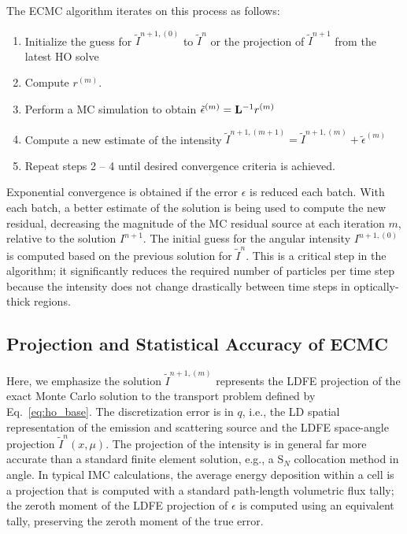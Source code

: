 The ECMC algorithm iterates on this process as follows:
\begin{enumerate}
    \item Initialize the guess for $\tilde{I}^{n+1,(0)}$ to $\tilde{I}^{n}$ or the
        projection of $\tilde{I}^{n+1}$ from the latest HO solve
\item Compute $r^{(m)}$.
\item Perform a MC simulation to obtain $\tilde{\epsilon}^{(m)} = \mathbf{L}^{-1} r^{(m)}$
\item Compute a new estimate of the intensity $\tilde I^{n+1,(m+1)} = \tilde I^{n+1,(m)}
+ \tilde\epsilon^{(m)}$
\item Repeat steps 2 -- 4 until desired convergence criteria is achieved. 
\end{enumerate}
Exponential convergence is obtained if the error $\epsilon$ is reduced each batch.  With each batch, a
better estimate of the solution is being used to compute the new residual, decreasing
the magnitude of the MC residual source at each iteration $m$, relative to the solution
$I^{n+1}$.
The initial guess for the angular intensity $I^{n+1,(0)}$ is computed based on the previous solution
for $\tilde{I}^{n}$. This is a critical step in the algorithm; it significantly reduces the required number of
particles per time step because the intensity does not change drastically between time steps in
optically-thick regions.  


\subsection{Projection and Statistical Accuracy of ECMC}

Here, we emphasize the solution $\tilde{I}^{n+1,(m)}$ represents the LDFE projection of the exact Monte Carlo
solution to the transport problem defined by Eq.~\eqref{eq:ho_base}.  The discretization error is in $q$, i.e., the LD spatial
representation of the emission and scattering source and the LDFE space-angle projection $\tilde I^{n}(x,\mu)$.
 The projection of the intensity is in
general far more accurate than a standard finite element solution, e.g., a S$_N$ collocation method in angle.  In typical IMC calculations, the average
energy deposition within a cell is a projection that is computed with a standard path-length volumetric
flux tally; the zeroth moment of the LDFE projection of ${\epsilon}$ is
computed using an equivalent tally, preserving the zeroth moment of the true error.

